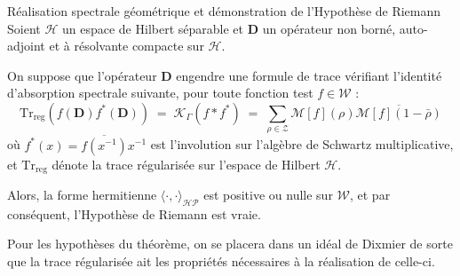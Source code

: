 \documentclass[Riemann_Hypothesis.tex]{subfiles}
\begin{document}
\begin{theorem}[label=th:ResolutionConjectureHP_fr_intro]{Réalisation spectrale géométrique et démonstration de l'Hypothèse de Riemann}
    Soient $\mathcal{H}$ un espace de Hilbert séparable et $\mathbf{D}$ un opérateur non borné, auto-adjoint et à résolvante compacte sur $\mathcal{H}$. \par
    On suppose que l'opérateur $\mathbf{D}$ engendre une formule de trace vérifiant l'identité d'absorption spectrale suivante, pour toute fonction test $f \in \mathcal{W}$ :
    \begin{equation*}
        \mathrm{Tr}_{\mathrm{reg}}\left( f(\mathbf{D}) f^*(\mathbf{D}) \right) \;=\; \mathcal{K}_\Gamma(f * f^*) \;=\; \sum_{\rho \in \mathcal{Z}} \mathcal{M}[f](\rho) \overline{\mathcal{M}[f](1-\bar{\rho})}
    \end{equation*}
    où $f^*(x) = \overline{f(x^{-1})} x^{-1}$ est l'involution sur l'algèbre de Schwartz multiplicative, et $\mathrm{Tr}_{\mathrm{reg}}$ dénote la trace régularisée sur l'espace de Hilbert $\mathcal{H}$. \par
    Alors, la forme hermitienne $\langle \cdot, \cdot \rangle_{\mathcal{HP}}$ est positive ou nulle sur $\mathcal{W}$, et par conséquent, l'Hypothèse de Riemann est vraie.
\end{theorem}

Pour les hypothèses du théorème, on se placera dans un 
idéal de Dixmier de sorte que la trace régularisée ait les 
propriétés nécessaires à la réalisation de celle-ci.
\end{document}
